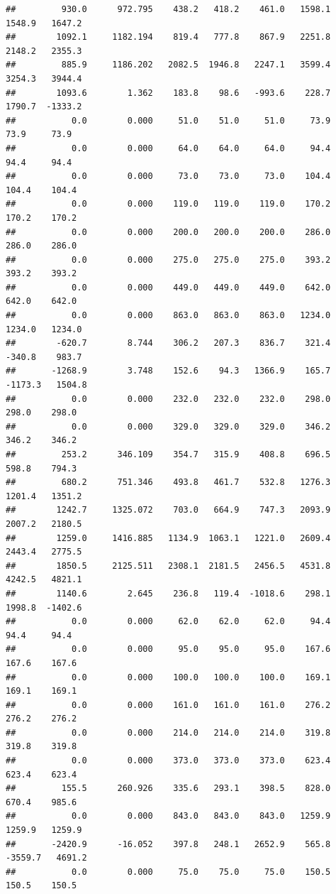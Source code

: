 \documentclass[
]{article}
\begin{document}
\begin{verbatim}
##         930.0      972.795    438.2   418.2    461.0   1598.1   1548.9   1647.2
##        1092.1     1182.194    819.4   777.8    867.9   2251.8   2148.2   2355.3
##         885.9     1186.202   2082.5  1946.8   2247.1   3599.4   3254.3   3944.4
##        1093.6        1.362    183.8    98.6   -993.6    228.7   1790.7  -1333.2
##           0.0        0.000     51.0    51.0     51.0     73.9     73.9     73.9
##           0.0        0.000     64.0    64.0     64.0     94.4     94.4     94.4
##           0.0        0.000     73.0    73.0     73.0    104.4    104.4    104.4
##           0.0        0.000    119.0   119.0    119.0    170.2    170.2    170.2
##           0.0        0.000    200.0   200.0    200.0    286.0    286.0    286.0
##           0.0        0.000    275.0   275.0    275.0    393.2    393.2    393.2
##           0.0        0.000    449.0   449.0    449.0    642.0    642.0    642.0
##           0.0        0.000    863.0   863.0    863.0   1234.0   1234.0   1234.0
##        -620.7        8.744    306.2   207.3    836.7    321.4   -340.8    983.7
##       -1268.9        3.748    152.6    94.3   1366.9    165.7  -1173.3   1504.8
##           0.0        0.000    232.0   232.0    232.0    298.0    298.0    298.0
##           0.0        0.000    329.0   329.0    329.0    346.2    346.2    346.2
##         253.2      346.109    354.7   315.9    408.8    696.5    598.8    794.3
##         680.2      751.346    493.8   461.7    532.8   1276.3   1201.4   1351.2
##        1242.7     1325.072    703.0   664.9    747.3   2093.9   2007.2   2180.5
##        1259.0     1416.885   1134.9  1063.1   1221.0   2609.4   2443.4   2775.5
##        1850.5     2125.511   2308.1  2181.5   2456.5   4531.8   4242.5   4821.1
##        1140.6        2.645    236.8   119.4  -1018.6    298.1   1998.8  -1402.6
##           0.0        0.000     62.0    62.0     62.0     94.4     94.4     94.4
##           0.0        0.000     95.0    95.0     95.0    167.6    167.6    167.6
##           0.0        0.000    100.0   100.0    100.0    169.1    169.1    169.1
##           0.0        0.000    161.0   161.0    161.0    276.2    276.2    276.2
##           0.0        0.000    214.0   214.0    214.0    319.8    319.8    319.8
##           0.0        0.000    373.0   373.0    373.0    623.4    623.4    623.4
##         155.5      260.926    335.6   293.1    398.5    828.0    670.4    985.6
##           0.0        0.000    843.0   843.0    843.0   1259.9   1259.9   1259.9
##       -2420.9      -16.052    397.8   248.1   2652.9    565.8  -3559.7   4691.2
##           0.0        0.000     75.0    75.0     75.0    150.5    150.5    150.5

\end{verbatim}
\end{document}
